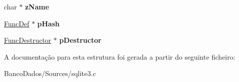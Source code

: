 \begin{DoxyCompactItemize}
\item 
\hypertarget{struct_func_def_a1135e622a3a505c7c463e975846ef926}{char $\ast$ {\bfseries z\-Name}}\label{struct_func_def_a1135e622a3a505c7c463e975846ef926}

\item 
\hypertarget{struct_func_def_a04561444155a6922d6a2d99a29d35281}{\hyperlink{struct_func_def}{Func\-Def} $\ast$ {\bfseries p\-Hash}}\label{struct_func_def_a04561444155a6922d6a2d99a29d35281}

\item 
\hypertarget{struct_func_def_a1bd12675375b838b5c00b1c79c1e6301}{\hyperlink{struct_func_destructor}{Func\-Destructor} $\ast$ {\bfseries p\-Destructor}}\label{struct_func_def_a1bd12675375b838b5c00b1c79c1e6301}

\end{DoxyCompactItemize}


A documentação para esta estrutura foi gerada a partir do seguinte ficheiro\-:\begin{DoxyCompactItemize}
\item 
Banco\-Dados/\-Sources/sqlite3.\-c\end{DoxyCompactItemize}
